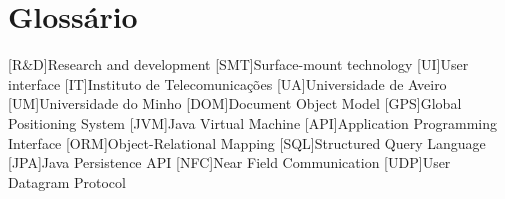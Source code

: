 \chapter{Glossário}

\footnotesize
\SingleSpacing

\begin{multicols}{2}
\begin{acronym}[AAAA]

	[R\&D]{Research and development}
	[SMT]{Surface-mount technology}
	[UI]{User interface}
	[IT]{Instituto de Telecomunicações}
	[UA]{Universidade de Aveiro}
	[UM]{Universidade do Minho}
	[DOM]{Document Object Model}
	[GPS]{Global Positioning System}
	[JVM]{Java Virtual Machine}
	[API]{Application Programming Interface}
	[ORM]{Object-Relational Mapping}
	[SQL]{Structured Query Language}
	[JPA]{Java Persistence API}
	[NFC]{Near Field Communication}
	[UDP]{User Datagram Protocol}

\end{acronym}
\end{multicols}

